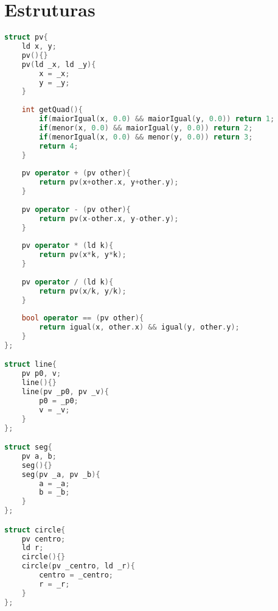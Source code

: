 \documentclass[12pt,a4paper, twoside]{report}
\begin{document}
\section{Estruturas}
\noindent\begin{lstlisting}[caption=Estruturas,language=C++]
struct pv{
    ld x, y;
    pv(){}
    pv(ld _x, ld _y){
        x = _x;
        y = _y;
    }
    
    int getQuad(){
        if(maiorIgual(x, 0.0) && maiorIgual(y, 0.0)) return 1;
        if(menor(x, 0.0) && maiorIgual(y, 0.0)) return 2;
        if(menorIgual(x, 0.0) && menor(y, 0.0)) return 3;
        return 4;
    }
    
    pv operator + (pv other){
        return pv(x+other.x, y+other.y);
    }
    
    pv operator - (pv other){
        return pv(x-other.x, y-other.y);
    }
    
    pv operator * (ld k){
        return pv(x*k, y*k);
    }
    
    pv operator / (ld k){
        return pv(x/k, y/k);
    }
    
    bool operator == (pv other){
        return igual(x, other.x) && igual(y, other.y);
    }
};

struct line{
    pv p0, v;
    line(){}
    line(pv _p0, pv _v){
        p0 = _p0;
        v = _v;
    }
};

struct seg{
    pv a, b;
    seg(){}
    seg(pv _a, pv _b){
        a = _a;
        b = _b;
    }
};

struct circle{
    pv centro;
    ld r;
    circle(){}
    circle(pv _centro, ld _r){
        centro = _centro;
        r = _r;
    }
};

\end{lstlisting}
\end{document}
